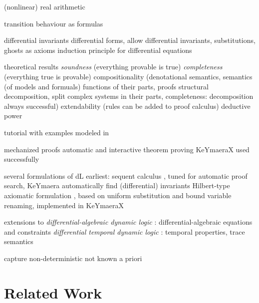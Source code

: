     (nonlinear) real arithmetic

    transition behaviour as formulas

    differential invariants
    differential forms, allow differential invariants, substitutions, ghosts as axioms
    induction principle for differential equations

    theoretical results
    \emph{soundness} (everything provable is true)
    \emph{completeness} (everything true is provable)
    compositionality (denotational semantics, semantics (of models and formuals) functions of their parts, proofs structural decomposition, split complex systems in their parts, completeness: decomposition always successful)
    extendability (rules can be added to proof calculus)
    deductive power

	tutorial with examples modeled in \dL
	\cite{Quesel16Tutorial}

	mechanized proofs
	automatic and interactive theorem proving
	KeYmaeraX
    used successfully

	several formulations of dL
	earliest: sequent calculus \cite{Platzer10HybridSystems}, tuned for automatic proof search, KeYmaera
    automatically find (differential) invariants
	Hilbert-type axiomatic formulation \cite{Platzer15Uniform}, based on uniform substitution and bound variable renaming, implemented in KeYmaeraX

    extensions to \dL
    \emph{differential-algebraic dynamic logic} \DAL: differential-algebraic equations and constraints
    \emph{differential temporal dynamic logic} \dTL: temporal properties, trace semantics


	capture non-deterministic
	not known a priori

	\section{Related Work}
	\cite{Huang16BoundedVerificationNNDS}